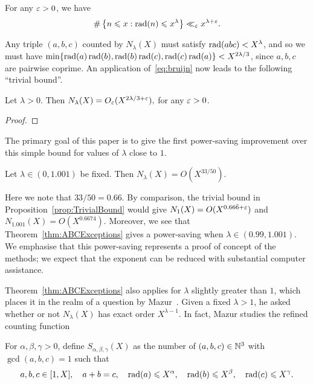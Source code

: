 \begin{lemma}\label{lem:deBruijnRadical}
For any $\varepsilon>0$, we have
\begin{equation}\label{eq:bruijn}
\#\left\{n\leqslant x : \operatorname{rad}(n)\leqslant x^\lambda\right\} \ll_\varepsilon x^{\lambda+\varepsilon}.
\end{equation}
\end{lemma}
Any triple $(a,b,c)$ counted by
$N_\lambda(X)$ must satisfy $\operatorname{rad}(abc)< X^{\lambda}$, and so
we must have
$\min\{\operatorname{rad}(a)\operatorname{rad}(b),\operatorname{rad}(b)\operatorname{rad}(c),\operatorname{rad}(c)\operatorname{rad}(a)\}< X^{2\lambda/3}$, since $a,b,c$ are pairwise coprime.
An application of~\eqref{eq:bruijn} now leads to the following ``trivial bound''.

\begin{proposition}\label{prop:TrivialBound}
Let $\lambda>0$. Then
$
N_\lambda(X)=O_\varepsilon( X^{2\lambda/3+\varepsilon}),
$
for any $\varepsilon>0$.
\end{proposition}
\begin{proof}
\end{proof}


The primary goal of this paper is to give the first power-saving improvement over this simple bound for values of $\lambda$ close to $1$.


\begin{theorem}\label{thm:ABCExceptions}
Let $\lambda\in (0, 1.001)$ be fixed. Then
$N_\lambda(X)=O( X^{33/50})$.
\end{theorem}

Here we note that $33/50=0.66$. By comparison, the trivial bound in Proposition~\ref{prop:TrivialBound} would give $N_1(X)=O(X^{0.66\bar{6}+\varepsilon})$ and $N_{1.001}(X)=O(X^{0.6674})$.
Moreover, we see that Theorem~\ref{thm:ABCExceptions} gives a power-saving when $\lambda\in (0.99,1.001)$. We emphasise that this power-saving represents a proof of concept of the methods; we expect that the exponent can be reduced with substantial computer assistance.


 Theorem~\ref{thm:ABCExceptions} also applies for $\lambda$ slightly greater than $1$,
 which places it in the realm of a question by Mazur~\cite{mazur}.
Given a fixed $\lambda>1$, he asked whether or not
$ N_\lambda(X)$ has exact order
 $ X^{\lambda-1}$.
 In fact, Mazur studies
 the refined counting function

\begin{definition}\label{def:Sabc}
For $\alpha,\beta,\gamma>0$, define $S_{\alpha,\beta,\gamma}(X)$
as the number of
 $(a,b,c)\in \mathbb{N}^3$
with $\gcd(a,b,c)=1$ such that
 \[
 a,b,c\in [1,X], \quad a+b=c, \quad \operatorname{rad}(a)\leqslant X^\alpha, \quad
 \operatorname{rad}(b)\leqslant X^\beta, \quad
 \operatorname{rad}(c)\leqslant X^\gamma.
 \]
\end{definition}

